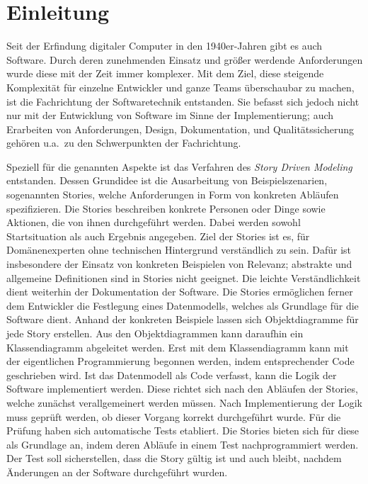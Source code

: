 \chapter{Einleitung}\label{ch:introduction}

Seit der Erfindung digitaler Computer in den 1940er-Jahren gibt es auch Software.
Durch deren zunehmenden Einsatz und größer werdende Anforderungen wurde diese mit der Zeit immer komplexer.
Mit dem Ziel, diese steigende Komplexität für einzelne Entwickler und ganze Teams überschaubar zu machen, ist die Fachrichtung der Softwaretechnik entstanden.
Sie befasst sich jedoch nicht nur mit der Entwicklung von Software im Sinne der Implementierung;
auch Erarbeiten von Anforderungen, Design, Dokumentation, und Qualitätssicherung gehören u.a.\ zu den Schwerpunkten der Fachrichtung.

Speziell für die genannten Aspekte ist das Verfahren des \emph{Story Driven Modeling}~\cite{sdm} entstanden.
Dessen Grundidee ist die Ausarbeitung von Beispielszenarien, sogenannten Stories, welche Anforderungen in Form von konkreten Abläufen spezifizieren.
Die Stories beschreiben konkrete Personen oder Dinge sowie Aktionen, die von ihnen durchgeführt werden.
Dabei werden sowohl Startsituation als auch Ergebnis angegeben.
Ziel der Stories ist es, für Domänenexperten ohne technischen Hintergrund verständlich zu sein.
Dafür ist insbesondere der Einsatz von konkreten Beispielen von Relevanz;
abstrakte und allgemeine Definitionen sind in Stories nicht geeignet.
Die leichte Verständlichkeit dient weiterhin der Dokumentation der Software.
Die Stories ermöglichen ferner dem Entwickler die Festlegung eines Datenmodells, welches als Grundlage für die Software dient.
Anhand der konkreten Beispiele lassen sich Objektdiagramme für jede Story erstellen.
Aus den Objektdiagrammen kann daraufhin ein Klassendiagramm abgeleitet werden.
Erst mit dem Klassendiagramm kann mit der eigentlichen Programmierung begonnen werden, indem entsprechender Code geschrieben wird.
Ist das Datenmodell als Code verfasst, kann die Logik der Software implementiert werden.
Diese richtet sich nach den Abläufen der Stories, welche zunächst verallgemeinert werden müssen.
Nach Implementierung der Logik muss geprüft werden, ob dieser Vorgang korrekt durchgeführt wurde.
Für die Prüfung haben sich automatische Tests etabliert.
Die Stories bieten sich für diese als Grundlage an, indem deren Abläufe in einem Test nachprogrammiert werden.
Der Test soll sicherstellen, dass die Story gültig ist und auch bleibt, nachdem Änderungen an der Software durchgeführt wurden.

